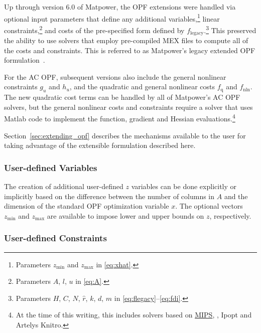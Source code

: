 \documentclass[12pt]{article}
\newcommand{\matlab}[0]{{\sc Matlab}}
\newcommand{\matpower}[0]{{\sc Matpower}}
\newcommand{\mips}[0]{{MIPS}}
\newcommand{\mipsurl}[0]{https://github.com/MATPOWER/mips}
\newcommand{\mipslink}[0]{\href{\mipsurl}{\mips{}}}
\newcommand{\ipopt}[0]{{\sc Ipopt}}
\newcommand{\knitro}[0]{{Artelys Knitro}}
\newcommand{\code}[1]{{\relsize{-0.5}{\tt{{#1}}}}}  %
\numberwithin{equation}{section}
\numberwithin{table}{section}
\numberwithin{figure}{section}
\begin{document}
Up through version 6.0 of \matpower{}, the OPF extensions were handled via optional input parameters that define any additional variables,\footnote{Parameters $z_\mathrm{min}$ and $z_\mathrm{max}$ in \eqref{eq:xhat}.} linear constraints,\footnote{Parameters $A$, $l$, $u$ in \eqref{eq:A}.} and costs of the pre-specified form defined by $f_\mathrm{legacy}$.\footnote{Parameters $H$, $C$, $N$, $\hat{r}$, $k$, $d$, $m$ in \eqref{eq:flegacy}--\eqref{eq:fdi}.} This preserved the ability to use solvers that employ pre-compiled MEX files to compute all of the costs and constraints. This is referred to as \matpower{}'s legacy extended OPF formulation~\cite{zimmerman2009}.

For the AC OPF, subsequent versions also include the general nonlinear constraints $g_u$ and $h_u$, and the quadratic and general nonlinear costs $f_\mathrm{q}$ and $f_\mathrm{nln}$. The new quadratic cost terms can be handled by all of \matpower{}'s AC OPF solvers, but the general nonlinear costs and constraints require a solver that uses \matlab{} code to implement the function, gradient and Hessian evaluations.\footnote{At the time of this writing, this includes solvers based on \mipslink{}, \code{fmincon}, \ipopt{} and \knitro{}.} 

Section~\ref{sec:extending_opf} describes the mechanisms available to the user for taking advantage of the extensible formulation described here.

\subsubsection{User-defined Variables}

The creation of additional user-defined $z$ variables can be done explicitly or implicitly based on the difference between the number of columns in $A$ and the dimension of the standard OPF optimization variable $x$. The optional vectors $z_\mathrm{min}$ and $z_\mathrm{max}$ are available to impose lower and upper bounds on $z$, respectively.

\subsubsection{User-defined Constraints}
\end{document}
